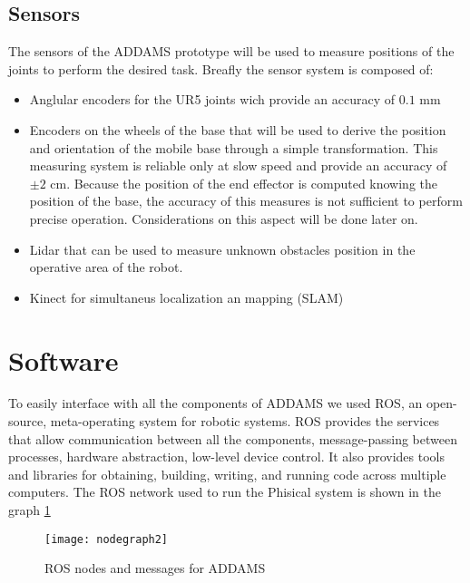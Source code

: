 \subsection{Sensors}

The sensors of the ADDAMS prototype will be used to measure positions of the joints to perform the desired task. Breafly the sensor system is composed of:
\begin{itemize}
	\item Anglular encoders for the UR5 joints wich provide an accuracy of $0.1$ mm
	\item Encoders on the wheels of the base that will be used to derive the position and orientation of the mobile base through a simple transformation. This measuring system is reliable only at slow speed and provide an accuracy of $\pm 2$ cm. Because the position of the end effector is computed knowing the position of the base, the accuracy of this measures is not sufficient to perform precise operation. Considerations on this aspect will be done later on.
	\item Lidar that can be used to measure unknown obstacles position in the operative area of the robot.
	\item Kinect for simultaneus localization an mapping (SLAM)
\end{itemize}

\section{Software}

To easily interface with all the components of ADDAMS we used ROS, an open-source, meta-operating system for robotic systems. ROS provides the services that allow communication between all the components, message-passing between processes, hardware abstraction, low-level device control. It also provides tools and libraries for obtaining, building, writing, and running code across multiple computers. The ROS network used to run the Phisical system is shown in the graph \ref{ROSnodes}

\begin{figure}[htbp]
	\begin{center} 
		\texttt{[image: nodegraph2]}
		\centering
		\label{ROSnodes} 
		\caption{ROS nodes and messages for ADDAMS}
	\end{center}
\end{figure}

